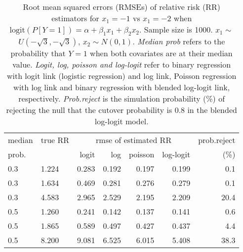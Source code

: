\documentclass[12pt,a4paper]{article}
\begin{document}
\begin{table}[H] 
\small\sf\centering 
\caption{Root mean squared errors (RMSEs) of relative risk (RR) estimators for $x_1=-1$ vs $x_1=-2$ when $\mbox{logit}(P[Y=1])=\alpha+\beta_1 x_1 + \beta_2 x_2$. Sample size is 1000. $x_1 \sim $$U(-\sqrt{3},-\sqrt{3})$, $x_2 \sim N(0,1)$. {\it Median prob} refers to the probability that $Y=1$ when both covariates are at their median value. {\it Logit, log, poisson and log-logit} refer to binary regression with logit link (logistic regression) and log link, Poisson regression with log link and binary regression with blended log-logit link, respectively. {\it Prob.reject} is the simulation probability (\%) of rejecting the null that the cutover probability is $0.8$ in the blended log-logit model.} 
\begin{tabular}{llrrrrr} 
\toprule 
median & true RR & \multicolumn{4}{c}{rmse of estimated RR} & prob.reject \\ 
prob. & & logit & log & poisson & log-logit  & (\%) \\ \midrule 
0.3 & 1.224 & 0.283 & 0.192 & 0.197 & 0.199 &  0.1 \\  
0.3 & 1.634 & 0.469 & 0.281 & 0.276 & 0.279 &  0.1 \\  
0.3 & 4.583 & 2.965 & 2.529 & 2.195 & 2.209 & 20.4 \\  
0.5 & 1.260 & 0.241 & 0.142 & 0.137 & 0.141 &  0.6 \\  
0.5 & 1.865 & 0.589 & 0.497 & 0.427 & 0.437 &  4.4 \\  
0.5 & 8.200 & 9.081 & 6.525 & 6.015 & 5.408 & 38.3 \\  
\bottomrule 
\end{tabular} 
\end{table} 
\end{document}
